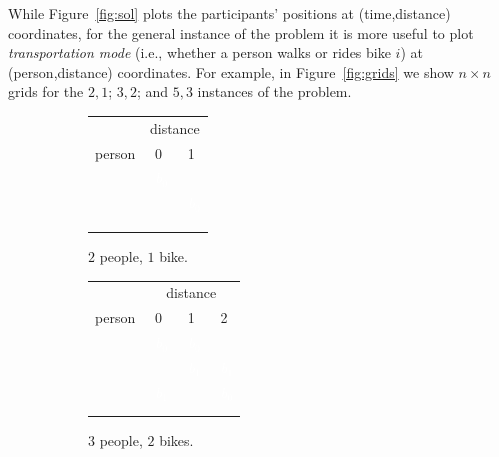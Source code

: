 \documentclass[DIV=calc, paper=a4, fontsize=11pt, twocolumn]{scrartcl}	 %
\begin{document}
While Figure~\ref{fig:sol} plots the participants' positions at (time,distance) coordinates, for the general instance of the problem it is more useful to plot {\em transportation mode} (i.e., whether a person walks or rides bike $i$) at (person,distance) coordinates. For example, in Figure~\ref{fig:grids} we show $n \times n$ grids for the $2,1$; $3,2$; and $5,3$ instances of the problem.

\newcommand\BA{\cellcolor{WildStrawberry}~\textcolor{White}{$b_0$}}
\newcommand\BB{\cellcolor{NavyBlue}      ~\textcolor{White}{$b_1$}}
\newcommand\BC{\cellcolor{OliveGreen}   ~\textcolor{White}{$b_2$}}
\begin{figure}[t]
	\begin{subfigure}[b]{0.28\textwidth}
		\begin{tabular}{rp{1.5em}|p{1.5em}|}
		& \multicolumn{2}{c}{distance} \\
		person & \multicolumn{1}{|c|}{0} & \multicolumn{1}{c|}{1} \\
		\hline
		\multicolumn{1}{r|}{\PA} & \BA & \\
		\cline{2-3}
		\multicolumn{1}{r|}{\PB} & & \BA \\
		\cline{2-3}
		\multicolumn{3}{c}{}\\
		\multicolumn{3}{c}{}\\
		\multicolumn{3}{c}{}\\
		\end{tabular}
		\caption{$2$ people, $1$ bike.}
	\end{subfigure}
	\begin{subfigure}[b]{0.33\textwidth}
		\begin{tabular}{rp{1.5em}|p{1.5em}|p{1.5em}|}
		& \multicolumn{3}{c}{distance} \\
		person & \multicolumn{1}{|c|}{0} & \multicolumn{1}{c|}{1} & \multicolumn{1}{c|}{2} \\
		\hline
		\multicolumn{1}{r|}{\PA} & \BA & \BA & \\
		\cline{2-4}
		\multicolumn{1}{r|}{\PB} & & \BB & \BB \\
		\cline{2-4}
		\multicolumn{1}{r|}{\PC} & \BB & & \BA \\
		\cline{2-4}
		\multicolumn{4}{c}{}\\
		\multicolumn{4}{c}{}\\
		\end{tabular}
		\caption{$3$ people, $2$ bikes.}
	\end{subfigure}
	\begin{subfigure}[b]{0.38\textwidth}
		\begin{tabular}{rp{1.5em}|p{1.5em}|p{1.5em}|p{1.5em}|p{1.5em}|}

\end{tabular}
\end{subfigure}
\end{figure}
\end{document}
